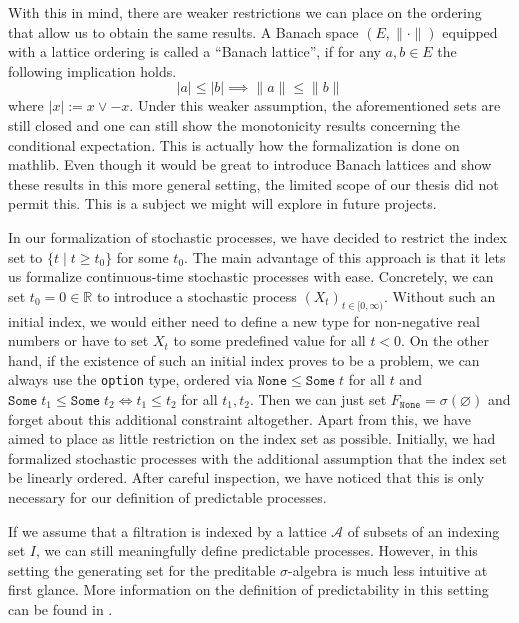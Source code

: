With this in mind, there are weaker restrictions we can place on the ordering that allow us to obtain the same results. A Banach space $(E, \lVert \cdot \rVert)$ equipped with a lattice ordering is called a ``Banach lattice'', if for any $a, b\in E$ the following implication holds.
\[
	\lvert a \rvert \le \lvert b \rvert \implies \lVert a \rVert \le \lVert b \rVert
\]
where $\lvert x \rvert := x \vee -x$. Under this weaker assumption, the aforementioned sets are still closed and one can still show the monotonicity results concerning the conditional expectation. This is actually how the formalization is done on \textsf{mathlib}. Even though it would be great to introduce Banach lattices and show these results in this more general setting, the limited scope of our thesis did not permit this. This is a subject we might will explore in future projects.

In our formalization of stochastic processes, we have decided to restrict the index set to $\{t \; \vert\; t \ge t_0\}$ for some $t_0$. The main advantage of this approach is that it lets us formalize continuous-time stochastic processes with ease. Concretely, we can set $t_0 = 0 \in \mathbb{R}$ to introduce a stochastic process $(X_t)_{t \in [0, \infty)}$. Without such an initial index, we would either need to define a new type for non-negative real numbers or have to set $X_t$ to some predefined value for all $t < 0$. On the other hand, if the existence of such an initial index proves to be a problem, we can always use the \texttt{option} type, ordered via $\texttt{None} \le \texttt{Some} \; t$ for all $t$ and $\texttt{Some} \; t_1 \le \texttt{Some} \; t_2 \iff t_1 \le t_2$ for all $t_1, t_2$. Then we can just set $F_{\texttt{None}} = \sigma(\varnothing)$ and forget about this additional constraint altogether. Apart from this, we have aimed to place as little restriction on the index set as possible. Initially, we had formalized stochastic processes with the additional assumption that the index set be linearly ordered. After careful inspection, we have noticed that this is only necessary for our definition of predictable processes.

\begin{remark} 
	If we assume that a filtration is indexed by a lattice $\mathcal{A}$ of subsets of an indexing set $I$, we can still meaningfully define predictable processes. However, in this setting the generating set for the preditable $\sigma$-algebra is much less intuitive at first glance. More information on the definition of predictability in this setting can be found in \cite{Ivanoff1993}.
\end{remark}


